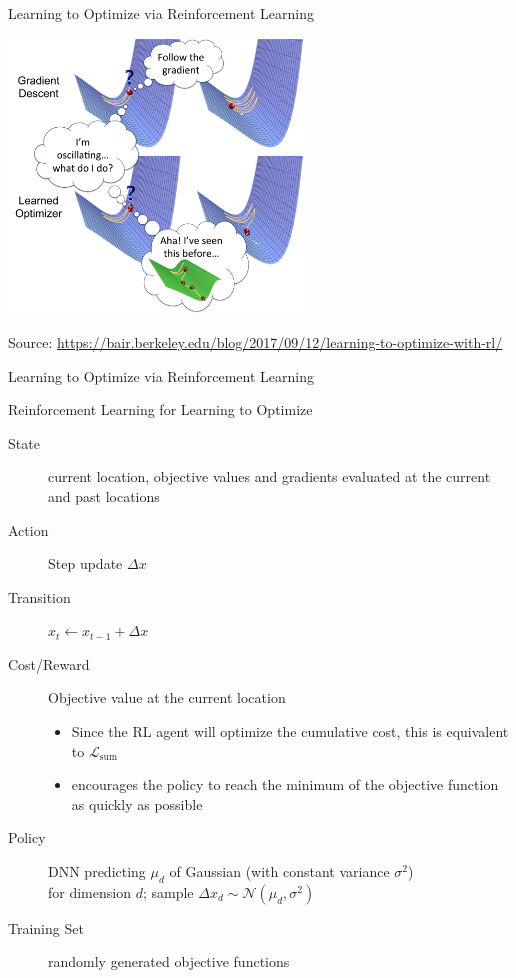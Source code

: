 \begin{frame}[c]{Learning to Optimize via Reinforcement Learning\newline {}}

\centering
\includegraphics[width=0.6\textwidth]{images/l2o_comic}

\tiny
Source: \url{https://bair.berkeley.edu/blog/2017/09/12/learning-to-optimize-with-rl/}

\end{frame}
\begin{frame}[c]{Learning to Optimize via Reinforcement Learning\newline {}}

\begin{block}{Reinforcement Learning for Learning to Optimize}
\begin{description}
\item[State] current location, objective values and gradients evaluated at the current and past locations
\pause
\item[Action] Step update $\Delta x$
\pause
\item[Transition] $x_t \leftarrow x_{t-1} + \Delta x$
\pause
\item[Cost/Reward] Objective value at the current location
\begin{itemize}
\item Since the RL agent will optimize the cumulative cost, this is equivalent to $\mathcal{L}_{\text{sum}}$
\item encourages the policy to reach the minimum of the objective function as quickly as possible
\end{itemize}
\pause
\item[Policy] DNN predicting $\mu_d$ of Gaussian (with constant variance $\sigma^2$)\\ for dimension $d$; sample $\Delta x_d \sim \mathcal{N}(\mu_d, \sigma^2)$
\pause
\item[Training Set] randomly generated objective functions
\end{description}
\end{block}

\end{frame}

